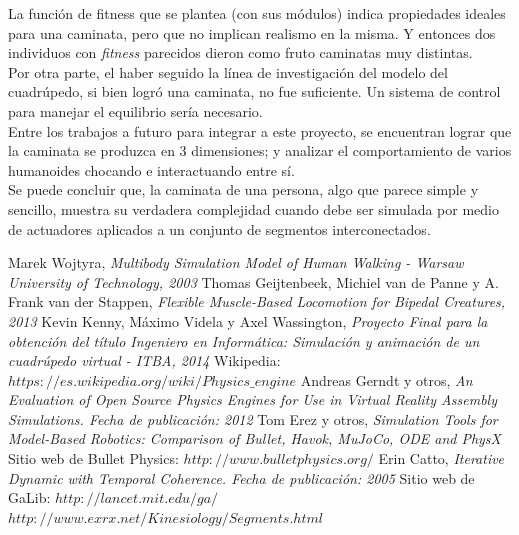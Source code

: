 \documentclass{article}
\begin{document}
La funci\'on de fitness que se plantea (con sus m\'odulos) indica propiedades ideales para una caminata, pero que no implican realismo en la misma. Y entonces dos individuos con \textit{fitness} parecidos dieron como fruto caminatas muy distintas.\\
Por otra parte, el haber seguido la l\'inea de investigaci\'on del modelo del cuadr\'upedo, si bien logr\'o una caminata, no fue suficiente. Un sistema de control para manejar el equilibrio ser\'ia necesario.\\
Entre los trabajos a futuro para integrar a este proyecto, se encuentran lograr que la caminata se produzca en 3 dimensiones; y analizar el comportamiento de varios humanoides chocando e  interactuando entre s\'i.\\
Se puede concluir que, la caminata de una persona, algo que parece simple y sencillo, muestra su verdadera complejidad cuando debe ser simulada por medio de actuadores aplicados a un conjunto de segmentos interconectados.
\newpage


\begin{thebibliography}{1}
Marek Wojtyra, \emph{Multibody Simulation Model of Human Walking - Warsaw University of Technology, 2003}
Thomas Geijtenbeek, Michiel van de Panne y A. Frank van der Stappen, \emph{Flexible Muscle-Based Locomotion for Bipedal Creatures, 2013 }
Kevin Kenny, M\'aximo Videla y Axel Wassington, \emph{Proyecto Final para la obtenci\'on del t\'itulo Ingeniero en Inform\'atica: Simulaci\'on y animaci\'on de un cuadr\'upedo virtual - ITBA, 2014}
 Wikipedia: $https://es.wikipedia.org/wiki/Physics\_engine$
Andreas Gerndt y otros, \emph{An Evaluation of Open Source Physics Engines for Use in Virtual Reality Assembly Simulations. Fecha de publicaci\'on: 2012}
Tom Erez y otros, \emph{Simulation Tools for Model-Based Robotics: Comparison of \textit{Bullet}, Havok, MuJoCo, ODE and PhysX}
 Sitio web de Bullet Physics: $http://www.bulletphysics.org/$
Erin Catto, \emph{Iterative Dynamic with Temporal Coherence. Fecha de publicaci\'on: 2005}
 Sitio web de GaLib: $http://lancet.mit.edu/ga/$
$http://www.exrx.net/Kinesiology/Segments.html$

\end{thebibliography}
\end{document}
